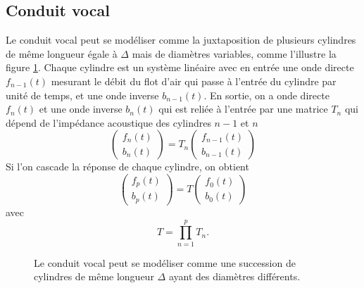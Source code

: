 \subsection{Conduit vocal}
\label{conduit-sec}
Le conduit vocal peut se mod\'eliser comme la juxtaposition
de plusieurs cylindres de m\^eme longueur \'egale \`a
$\Delta$ mais de diam\`etres variables,
comme l'illustre la figure \ref{conduit-voc}.
Chaque cylindre est un syst\`eme lin\'eaire avec en entr\'ee
une onde directe $f_{n-1} (t)$ mesurant le d\'ebit du flot d'air
qui passe \`a l'entr\'ee du cylindre par unit\'e de temps,
et une onde inverse
$b_{n-1} (t)$. En sortie, on a onde directe $f_n (t)$
et une onde inverse $b_n (t)$ qui est reli\'ee \`a l'entr\'ee
par une matrice $T_n$ qui d\'epend de l'imp\'edance acoustique
des cylindres $n-1$ et $n$
\[
\left(
\begin{array} {l}
f_n (t)\\
b_n (t)
\end{array}
\right) = T_n
\left(
\begin{array} {l}
f_{n-1} (t)\\
b_{n-1} (t)
\end{array}
\right)
\]
Si l'on cascade la r\'eponse de chaque cylindre, on obtient
\[
\left(
\begin{array} {l}
f_p (t)\\
b_p (t)
\end{array}
\right) = T
\left(
\begin{array} {l}
f_{0} (t)\\
b_{0} (t)
\end{array}
\right)
\]
avec
\[
T = \prod_{n=1}^{p} T_n .
\]


\begin{figure}
\vspace{3.5cm}
\caption{Le conduit vocal peut se mod\'eliser comme une
succession de cylindres de m\^eme longueur $\Delta$
ayant des diam\`etres
diff\'erents.}
\label{conduit-voc}
\end{figure}

